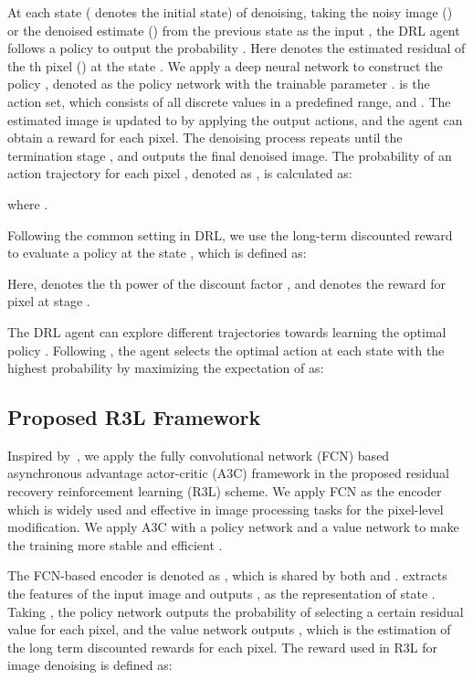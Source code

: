 \documentclass{article}
\begin{document}
At each state  ( denotes the initial state) of denoising, taking the noisy image () or the denoised estimate () from the previous state as the input , the DRL agent follows a policy  to output the probability  . 
Here  denotes the estimated residual of the th pixel () at the state . 
We apply a deep neural network to construct the policy , denoted as the policy network with the trainable parameter . 
 is the action set, which consists of all discrete values in a predefined range, and . 
The estimated image is updated to  by applying the output actions, and the agent can obtain a reward  for each pixel. The denoising process repeats until the termination stage , and outputs the final denoised image. The probability of an action trajectory  for each pixel , denoted as , is calculated as:

where .

Following the common setting in DRL, we use the long-term discounted reward  to evaluate a policy at the state , which is defined as: 

Here,  denotes the th power of the discount factor , and  denotes the reward for pixel  at stage .

The DRL agent can explore different trajectories towards learning the optimal policy . Following , the agent selects the optimal action at each state with the highest probability by maximizing the expectation of  as:

\subsection{Proposed R3L Framework}
Inspired by~\cite{furuta2019fully}, we apply the fully convolutional network (FCN) based asynchronous advantage actor-critic (A3C) \cite{mnih2016asynchronous} framework in the proposed residual recovery reinforcement learning (R3L) scheme. We apply FCN as the encoder which is widely used and effective in image processing tasks for the pixel-level modification. We apply A3C with a policy network  and a value network  to make the training more stable and efficient \cite{NIPS1999_464d828b}.

The FCN-based encoder is denoted as , which is shared by both  and . 
 extracts the features of the input image  and outputs , as the representation of state .
Taking , the policy network  outputs the probability of selecting a certain residual value  for each pixel, and the value network outputs , which is the estimation of the long term discounted rewards  for each pixel. 
The reward  used in R3L for image denoising is defined as:
\end{document}
